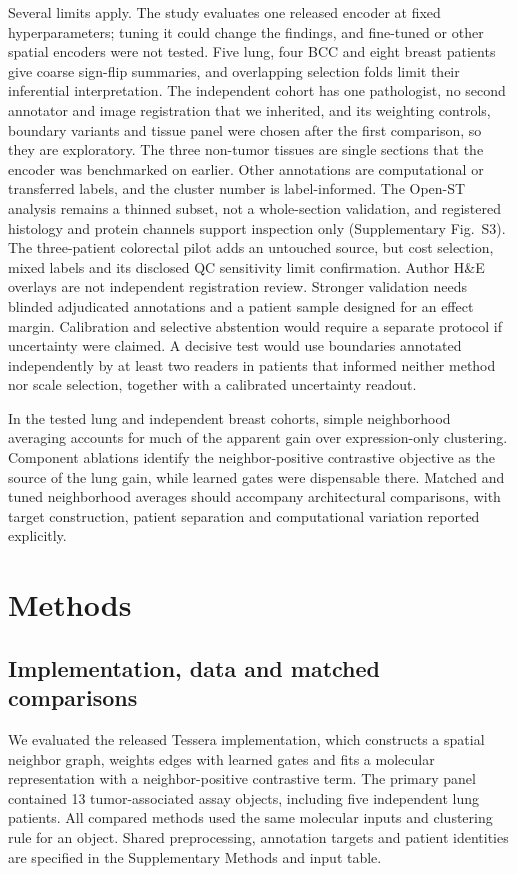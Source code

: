 \documentclass[11pt]{article}
\begin{document}
Several limits apply. The study evaluates one released encoder at fixed hyperparameters; tuning it could change the findings, and fine-tuned or other spatial encoders were not tested. Five lung, four BCC and eight breast patients give coarse sign-flip summaries, and overlapping selection folds limit their inferential interpretation. The independent cohort has one pathologist, no second annotator and image registration that we inherited, and its weighting controls, boundary variants and tissue panel were chosen after the first comparison, so they are exploratory. The three non-tumor tissues are single sections that the encoder was benchmarked on earlier. Other annotations are computational or transferred labels, and the cluster number is label-informed. The Open-ST analysis remains a thinned subset, not a whole-section validation, and registered histology and protein channels support inspection only (Supplementary Fig.~S3). The three-patient colorectal pilot adds an untouched source, but cost selection, mixed labels and its disclosed QC sensitivity limit confirmation. Author H\&E overlays are not independent registration review. Stronger validation needs blinded adjudicated annotations and a patient sample designed for an effect margin. Calibration and selective abstention would require a separate protocol if uncertainty were claimed. A decisive test would use boundaries annotated independently by at least two readers in patients that informed neither method nor scale selection, together with a calibrated uncertainty readout.

In the tested lung and independent breast cohorts, simple neighborhood averaging accounts for much of the apparent gain over expression-only clustering. Component ablations identify the neighbor-positive contrastive objective as the source of the lung gain, while learned gates were dispensable there. Matched and tuned neighborhood averages should accompany architectural comparisons, with target construction, patient separation and computational variation reported explicitly.


\section{Methods}
\subsection{Implementation, data and matched comparisons}
We evaluated the released Tessera implementation, which constructs a spatial neighbor graph, weights edges with learned gates and fits a molecular representation with a neighbor-positive contrastive term. The primary panel contained 13 tumor-associated assay objects, including five independent lung patients. All compared methods used the same molecular inputs and clustering rule for an object. Shared preprocessing, annotation targets and patient identities are specified in the Supplementary Methods and input table.
\end{document}
